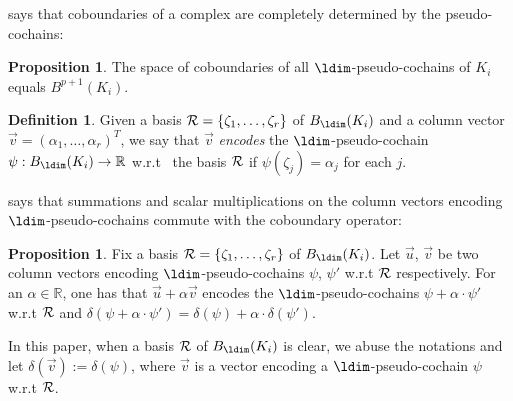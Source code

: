 \documentclass[10pt,a4paper]{amsart}
\newcommand {\mm}[1] {\ifmmode{#1}\else{\mbox{\(#1\)}}\fi}
\newcommand{\Rcal}        {\mm{\mathcal{R}}}
\theoremstyle{definition}
\newcommand{\red}{\color{red}}
\newcommand{\Bnd}{B}
\newcommand{\Real}{\mathbb{R}}
\newcommand{\aG}{\alpha}
\newcommand{\dG}{\delta}
\newcommand{\zG}{\zeta}
\let\bar\overline
\newtheorem{definition}[theorem]{Definition}
\newtheorem{proposition}[theorem]{Proposition}
\theoremstyle{remark}
\begin{document}
says that coboundaries of
a complex  are completely determined by the pseudo-cochains:

\begin{proposition}\label{prop:pseudocob-is-cob}
The space of coboundaries of all 
$\ldim$-pseudo-cochains of $K_i$ equals $\Bnd^{p+1}(K_i)$.
\end{proposition}

\begin{definition}
Given
a basis $\Rcal=\{\zG_1,\ldots,\zG_r\}$ of $\Bnd_\ldim(K_i)$
and
a column vector $\vec{v}=(\aG_1,\ldots,\aG_r)^T$,
we say that  $\vec{v}$ \emph{encodes} 
the $\ldim$-pseudo-cochain $\psi:\Bnd_\ldim(K_i)\to\Real$
w.r.t\ 
the basis $\Rcal$
if $\psi(\zG_j)=\aG_j$ for each $j$.
\end{definition}

says that summations and scalar multiplications
on the column vectors encoding 
$\ldim$-pseudo-cochains
commute with
the coboundary operator:

\begin{proposition}\label{prop:pseudo-coc-nat}
Fix
a basis $\Rcal=\{\zG_1,\ldots,\zG_r\}$ of $\Bnd_\ldim(K_i)$.
Let
$\vec{u}$, $\vec{v}$
be two column vectors encoding 
$\ldim$-pseudo-cochains $\psi$, $\psi'$
w.r.t $\Rcal$ respectively.
For an $\aG\in\Real$,
one has that $\vec{u}+\aG\vec{v}$ encodes
the $\ldim$-pseudo-cochains $\psi+\aG\cdot\psi'$
w.r.t $\Rcal$
and $\dG(\psi+\aG\cdot\psi')=\dG(\psi)+\aG\cdot\dG(\psi')$.
\end{proposition}

In this paper, when a basis
$\Rcal$ of $\Bnd_\ldim(K_i)$ is clear,
we abuse the notations and let $\dG(\vec{v}):=\dG(\psi)$,
where
$\vec{v}$ is a vector
encoding
a $\ldim$-pseudo-cochain $\psi$ w.r.t $\Rcal$.
\end{document}
